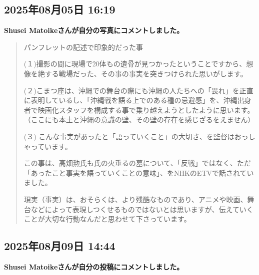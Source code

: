 \subsection*{2025年08月05日 16:19}

\textbf{Shusei Matoikeさんが自分の写真にコメントしました。}

\begin{quote}
パンフレットの記述で印象的だった事

(１)撮影の間に現場で20体もの遺骨が見つかったということですから、想像を絶する戦場だった、その事の事実を突きつけられた思いがします。

(２)こまつ座は、沖縄での舞台の際にも沖縄の人たちへの「畏れ」を正直に表明しているし、「沖縄戦を語る上でのある種の忌避感」を、沖縄出身者で映画化スタッフを構成する事で乗り越えようとしたように思います。（ここにも本土と沖縄の意識の壁、その壁の存在を感じざるをえません）

(３) こんな事実があったと「語っていくこと」の大切さ、を監督はおっしゃっています。

この事は、高畑勲氏も氏の火垂るの墓について、「反戦」ではなく、ただ「あったこと事実を語っていくことの意味」、をNHKのETVで話されていました。

現実（事実）は、おそらくは、より残酷なものであり、アニメや映画、舞台などによって表現しつくせるものではないとは思いますが、伝えていくことが大切な行動なんだと思わせて下さっています。
\end{quote}

\subsection*{2025年08月09日 14:44}

\textbf{Shusei Matoikeさんが自分の投稿にコメントしました。}

